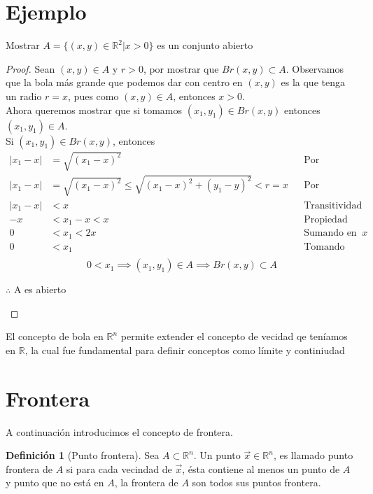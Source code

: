 \documentclass[letterpaper]{article}
\providecommand{\abs}[1]{\lvert#1\rvert}
\newcommand{\R}{\mathds{R}}
\renewcommand{\*}{\cdot}
\theoremstyle{definition}
\newtheorem{definition}{Definición}
\begin{document}
\section*{Ejemplo}
Mostrar $ A = \{ (x,y) \in \R^2 | x > 0 \} $ es un conjunto abierto
\begin{proof}
	Sean $(x,y) \in A $ y $ r > 0 $, por mostrar que $ Br(x,y)  \subset A$. Observamos que la bola más grande que podemos dar con centro en $ (x,y) $ es la que tenga un radio $ r = x $, pues como $ (x,y) \in A $, entonces $ x >0 $.\\
	
	Ahora queremos mostrar que si tomamos $ (x_1,y_1) \in Br(x,y) $ entonces $ (x_1,y_1) \in A $.\\
	
	Si $ (x_1,y_1) \in Br(x,y) $, entonces
	\begin{align*}
	\abs{x_1 - x} &= \sqrt{(x_1 - x)^2} && \text{Por definición de valor absoluto}\\
	\abs{x_1 - x} &= \sqrt{(x_1 - x)^2} \leq \sqrt{(x_1 - x)^2 + (y_1 - y)^2} < r = x && \text{Por construcción}\\
	\abs{x_1 - x} & < x && \text{Transitividad de la desigualdad}\\
	-x &< x_1 - x < x && \text{Propiedad del valor absoluto}\\
	0 &< x_1  < 2x && \text{Sumando en todos lados }x\\
	0 &< x_1  && \text{Tomando sólo esa parte de la desigualdad}\\
	\end{align*}
	\[ 0 < x_1 \implies (x_1,y_1) \in A \implies Br(x,y) \subset A \]
	\begin{center}
		$ \therefore $ A es abierto
	\end{center} 
\end{proof}
	El concepto de bola en $ \R^n $ permite extender el concepto de vecidad qe teníamos en $ \R $, la cual fue fundamental para definir conceptos como límite y continiudad
	\section{Frontera}
	A continuación introducimos el concepto de frontera.
	\begin{definition}[Punto frontera]
		Sea $ A \subset \R^n$. Un punto $ \vec{x} \in \R^n $, es llamado punto frontera de $ A $ si para cada vecindad de $ \vec{x} $, ésta contiene al menos un punto de $ A $ y punto que no está en $ A $, la frontera de $ A $ son todos sus puntos frontera.
	\end{definition}
\end{document}
